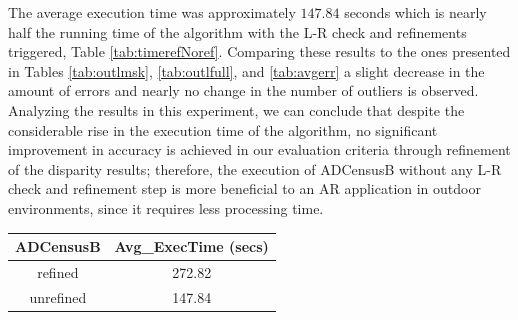 The average execution time was approximately $147.84$ seconds which is nearly half the running time of the algorithm with the L-R check and refinements 
triggered, Table \ref{tab:timerefNoref}. 
Comparing these results to the ones presented in Tables \ref{tab:outlmsk}, \ref{tab:outlfull}, and \ref{tab:avgerr} a slight decrease in the amount of errors and 
nearly no change in the number of outliers is observed.
Analyzing the results in this experiment, we can conclude that despite the considerable rise in the execution time of the algorithm, no significant
improvement in accuracy is achieved in our evaluation criteria through refinement of the disparity results; therefore, the execution of ADCensusB without any L-R check and
refinement step is more beneficial to an AR application in outdoor environments, since it requires less processing time.\newline

\begin{minipage}{\linewidth}
\begin{center}
\label{tab:timerefNoref}
\begin{tabular}{|c|c|}
\hline
ADCensusB & Avg\_ExecTime (secs) \\ \hline
refined & 272.82 \\  \hline
unrefined & 147.84 \\ \hline
\end{tabular}
\end{center}
\end{minipage} \newline

